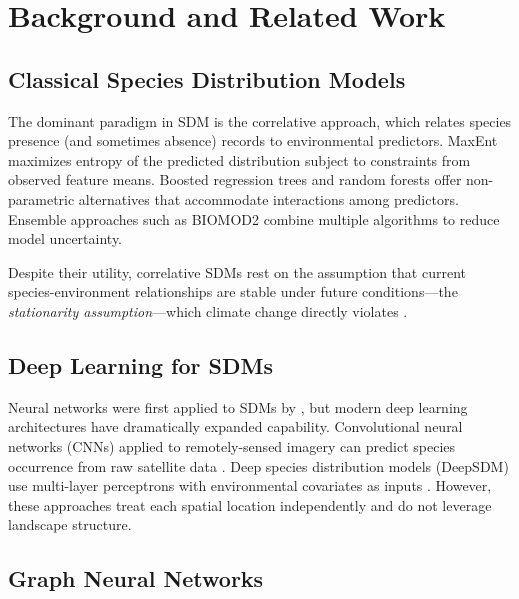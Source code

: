 \section{Background and Related Work}

\label{sec:background}

\subsection{Classical Species Distribution Models}

The dominant paradigm in SDM is the correlative approach, which relates
species presence (and sometimes absence) records to environmental
predictors. MaxEnt \citep{phillips2006maximum} maximizes entropy of the
predicted distribution subject to constraints from observed feature
means. Boosted regression trees \citep{elith2008working} and random
forests \citep{cutler2007random} offer non-parametric alternatives that
accommodate interactions among predictors. Ensemble approaches such as
BIOMOD2 \citep{thuiller2009biomod} combine multiple algorithms to reduce
model uncertainty.

Despite their utility, correlative SDMs rest on the assumption that
current species-environment relationships are stable under future
conditions---the \emph{stationarity assumption}---which climate change
directly violates \citep{dormann2012correlation}.

\subsection{Deep Learning for SDMs}

Neural networks were first applied to SDMs by \citet{lek1996application},
but modern deep learning architectures have dramatically expanded
capability. Convolutional neural networks (CNNs) applied to
remotely-sensed imagery can predict species occurrence from raw satellite
data \citep{deneu2021convolutional}. Deep species distribution models
(DeepSDM) use multi-layer perceptrons with environmental covariates as
inputs \citep{botella2018deep}. However, these approaches treat each
spatial location independently and do not leverage landscape structure.

\subsection{Graph Neural Networks}

